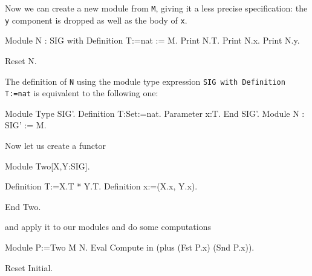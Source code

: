 Now we can create a new module from \texttt{M}, giving it a less
precise specification: the \texttt{y} component is dropped as well
as the body of \texttt{x}.

\begin{coq_example}
Module N  :  SIG with Definition T:=nat  :=  M.
Print N.T.
Print N.x.
Print N.y.
\end{coq_example}
\begin{coq_eval}
Reset N.
\end{coq_eval}

\noindent
The definition of \texttt{N} using the module type expression
\texttt{SIG with Definition T:=nat} is equivalent to the following
one:

\begin{coq_example*}
Module Type SIG'.
  Definition T:Set:=nat.
  Parameter x:T.
End SIG'.
Module N : SIG' := M.
\end{coq_example*}
Now let us create a functor
\begin{coq_example}
Module Two[X,Y:SIG].
\end{coq_example}
\begin{coq_example*}
  Definition T:=X.T * Y.T.
  Definition x:=(X.x, Y.x).
\end{coq_example*}
\begin{coq_example}
End Two.
\end{coq_example}
and apply it to our modules and do some computations
\begin{coq_example}
Module P:=Two M N.
Eval Compute in (plus (Fst P.x) (Snd P.x)).
\end{coq_example}
\begin{coq_eval}
Reset Initial.
\end{coq_eval}

